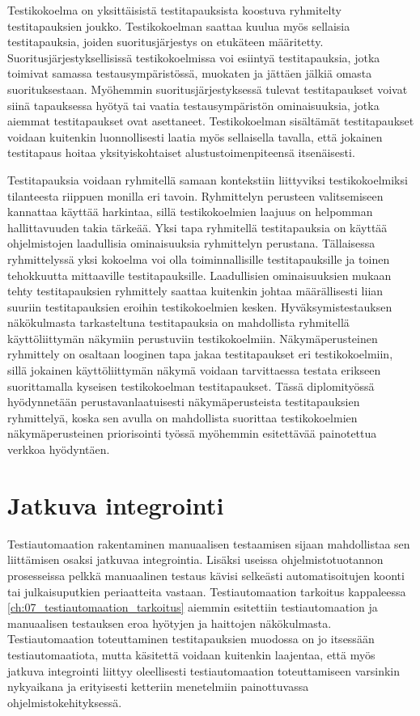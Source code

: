   Testikokoelma on yksittäisistä testitapauksista koostuva ryhmitelty testitapauksien joukko.
  Testikokoelman saattaa kuulua myös sellaisia testitapauksia, joiden suoritusjärjestys on etukäteen määritetty.
  Suoritusjärjestyksellisissä testikokoelmissa voi esiintyä testitapauksia, jotka toimivat samassa testausympäristössä, muokaten ja jättäen jälkiä omasta suorituksestaan.
  Myöhemmin suoritusjärjestyksessä tulevat testitapaukset voivat siinä tapauksessa hyötyä tai vaatia testausympäristön ominaisuuksia, jotka aiemmat testitapaukset ovat asettaneet.
  Testikokoelman sisältämät testitapaukset voidaan kuitenkin luonnollisesti laatia myös sellaisella tavalla, että jokainen testitapaus hoitaa yksityiskohtaiset alustustoimenpiteensä itsenäisesti.

  Testitapauksia voidaan ryhmitellä samaan kontekstiin liittyviksi testikokoelmiksi tilanteesta riippuen monilla eri tavoin.
  Ryhmittelyn perusteen valitsemiseen kannattaa käyttää harkintaa, sillä testikokoelmien laajuus on helpomman hallittavuuden takia tärkeää.
  Yksi tapa ryhmitellä testitapauksia on käyttää ohjelmistojen laadullisia ominaisuuksia ryhmittelyn perustana.
  Tällaisessa ryhmittelyssä yksi kokoelma voi olla toiminnallisille testitapauksille ja toinen tehokkuutta mittaaville testitapauksille.
  Laadullisien ominaisuuksien mukaan tehty testitapauksien ryhmittely saattaa kuitenkin johtaa määrällisesti liian suuriin testitapauksien eroihin testikokoelmien kesken.
  Hyväksymistestauksen näkökulmasta tarkasteltuna testitapauksia on mahdollista ryhmitellä käyttöliittymän näkymiin perustuviin testikokoelmiin.
  Näkymäperusteinen ryhmittely on osaltaan looginen tapa jakaa testitapaukset eri testikokoelmiin, sillä jokainen käyttöliittymän näkymä voidaan tarvittaessa testata erikseen suorittamalla kyseisen testikokoelman testitapaukset.
  Tässä diplomityössä hyödynnetään perustavanlaatuisesti näkymäperusteista testitapauksien ryhmittelyä, koska sen avulla on mahdollista suorittaa testikokoelmien näkymäperusteinen priorisointi työssä myöhemmin esitettävää painotettua verkkoa hyödyntäen.

\section{Jatkuva integrointi} \label{ch:07_jatkuva_integrointi}

  Testiautomaation rakentaminen manuaalisen testaamisen sijaan mahdollistaa sen liittämisen osaksi jatkuvaa integrointia.
  Lisäksi useissa ohjelmistotuotannon prosesseissa pelkkä manuaalinen testaus kävisi selkeästi automatisoitujen koonti tai julkaisuputkien periaatteita vastaan.
  Testiautomaation tarkoitus kappaleessa \ref{ch:07_testiautomaation_tarkoitus} aiemmin esitettiin testiautomaation ja manuaalisen testauksen eroa hyötyjen ja haittojen näkökulmasta.
  Testiautomaation toteuttaminen testitapauksien muodossa on jo itsessään testiautomaatiota, mutta käsitettä voidaan kuitenkin laajentaa, että myös jatkuva integrointi liittyy oleellisesti testiautomaation toteuttamiseen varsinkin nykyaikana ja erityisesti ketteriin menetelmiin painottuvassa ohjelmistokehityksessä.


